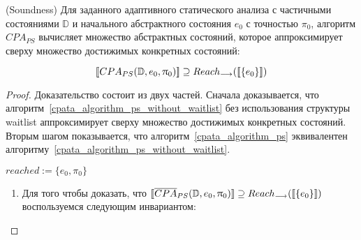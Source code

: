\begin{thrm}
\label{thrm_soundness}
(Soundness) Для заданного адаптивного статического анализа с частичными состояниями $\mathbb{D}$ и начального абстрактного состояния $e_0$ с точностью $\pi_0$, алгоритм $CPA_{PS}$ вычисляет множество абстрактных состояний, которое аппроксимирует сверху множество достижимых конкретных состояний:

$$[\![ CPA_{PS}(\mathbb{D}, e_0, \uppi_0) ]\!] \supseteq Reach_{\longrightarrow}([\![ \{e_0\} ]\!])$$

\end{thrm}

\begin{proof}

Доказательство состоит из двух частей. Сначала доказывается, что алгоритм~\ref{cpata_algorithm_ps_without_waitlist} без использования структуры waitlist аппроксимирует сверху множество достижимых конкретных состояний. Вторым шагом показывается, что алгоритм~\ref{cpata_algorithm_ps} эквивалентен алгоритму~\ref{cpata_algorithm_ps_without_waitlist}.

\begin{algorithm}[H]
 $reached := \{e_0,\pi_0\} $\;
 

 \caption{$\overline{CPA}_{PS}(\mathbb{D}, e_0, \pi_0)$}
 \label{cpata_algorithm_ps_without_waitlist}
\end{algorithm}

\begin{enumerate}
\item Для того чтобы доказать, что $[\![ \overline{CPA}_{PS}(\mathbb{D}, e_0, \uppi_0) ]\!] \supseteq Reach_{\longrightarrow}([\![ \{e_0\} ]\!])$ воспользуемся следующим инвариантом:


\end{enumerate}
\end{proof}
